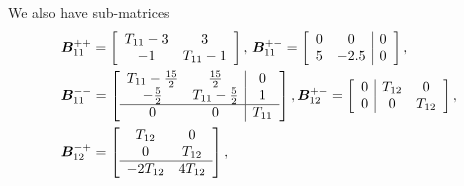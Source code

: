 We also have sub-matrices
\begin{align*}
	&{  \bs B}_{11}^{++} = \left[\begin{array}{cc}
		T_{11}-3 & 3 \\
		-1 & T_{11}-1
	\end{array}\right],
	\,
	{  \bs B}_{11}^{+-} = \left[\begin{array}{cc|c}
		0 & 0 & 0\\
		5 & -2.5 & 0
	\end{array}\right], 
	\,
	\\&{  \bs B}_{11}^{--} = \left[\begin{array}{cc|c}
		T_{11}-\frac{15}{2} & \frac{15}{2} & 0\\
		-\frac{5}{2} & T_{11}-\frac{5}{2} & 1\\\hline
		0 & 0 & T_{11}
	\end{array}\right],
	{  \bs B}_{12}^{+-} = \left[\begin{array}{c|cc}
		0 & T_{12} & 0 \\
		0 & 0 & T_{12}
	\end{array}\right], \,
	\\&{  \bs B}_{12}^{-+} = \left[\begin{array}{cc}
		T_{12} & 0 \\
		0 & T_{12} \\\hline
		-2T_{12} & 4T_{12}
	\end{array}\right],
	\, 

\end{align*}
